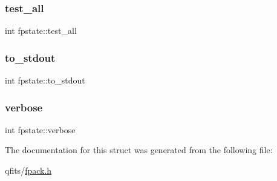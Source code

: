 \mbox{\label{structfpstate_a6e44a8cac2e7e4be04898e34696e9810}} 
\subsubsection{\texorpdfstring{test\+\_\+all}{test\_all}}
{\footnotesize\ttfamily int fpstate\+::test\+\_\+all}

\mbox{\label{structfpstate_a771bb8f906dbb9e52983b5b650a4454a}} 
\subsubsection{\texorpdfstring{to\+\_\+stdout}{to\_stdout}}
{\footnotesize\ttfamily int fpstate\+::to\+\_\+stdout}

\mbox{\label{structfpstate_ae8ee1c7a7d279650903ed88fa4b7bb01}} 
\subsubsection{\texorpdfstring{verbose}{verbose}}
{\footnotesize\ttfamily int fpstate\+::verbose}



The documentation for this struct was generated from the following file\+:\begin{DoxyCompactItemize}
\item 
qfits/\hyperlink{fpack_8h}{fpack.\+h}\end{DoxyCompactItemize}
